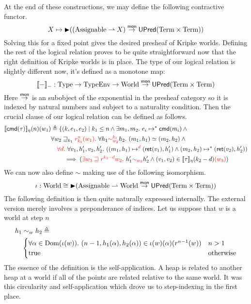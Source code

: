At the end of these constructions, we may define the following
contractive functor.
\[
  X \mapsto \later ((\assignables \pto X) \mto \upred{\term \times \term})
\]
Solving this for a fixed point gives the desired presheaf of Kripke
worlds. Defining the rest of the logical relation proves to be quite
straightforward now that the right definition of Kripke worlds is in
place. The type of our logical relation is slightly different now,
it's defined as a monotone map:
\[
  \den{-}_{-} : \types \to \typesEnv \to \worlds \mto \upred{\term \times \term}
\]
Here $\mto$ is an subobject of the exponential in the presheaf
category so it is indexed by natural numbers and subject to a
naturality condition. Then the crucial clause of our logical relation
can be defined as follows.
\begin{align*}
  \den{\cmd{\tau}}_\eta(n)(w_1)& \triangleq \{(k, e_1, e_2) \mid
  k_1 \le n \land \exists m_1, m_2.\ \steps{e_i}{\cmd{m_i}} \land{}\\
  &\forall w_2 \breach_{k_1} \different{r_{k_1}^n(w_1)}.\ \forall h_1 \different{\sim_{w_2}^{k_1}} h_2.
  \ (m_1, h_1) \simeq (m_2, h_2) \land{}\\
  &\quad \different{\forall d.}\ \forall v_1, h_1', v_2, h_2'.
  \ (\stepsM[\different{d}]{m_1}{h_1}{\ret{v_1}}{h_1'} \land \stepsM{m_2}{h_2}{\ret{v_2}}{h_2'})\\
  &\qquad \implies (\different{\exists w_3 \breach r^{k_2 - d}w_2}.
    \ h_1' \different{\sim_{w_3}} h_2' \land (v_1, v_2) \in \den{\tau}_\eta(k_2 - d)\different{(w_3)})
\end{align*}
We can now also define $\sim$ making use of the following isomorphism.
\[
  \iota : \worlds \cong
  \later (\assignables \pto \worlds \mto \upred{\term \times \term})
\]
The following definition is then quite naturally expressed
internally. The external version merely involves a preponderance of
indices. Let us suppose that $w$ is a world at step $n$
\begin{align*}
  h_1 &{}\sim_w h_2 \defs\\
  &\begin{cases}
    \forall \alpha \in \dom(\iota(w)).\ (n - 1, h_1(\alpha), h_2(\alpha)) \in \iota(w)(\alpha)(r^{n - 1}(w))
    & n > 1\\
    \text{true} & \text{otherwise}
  \end{cases}
\end{align*}
The essence of the definition is the self-application. A heap is
related to another heap at a world if all of the points are related
relative to the same world. It was this circularity and
self-application which drove us to step-indexing in the first place.

